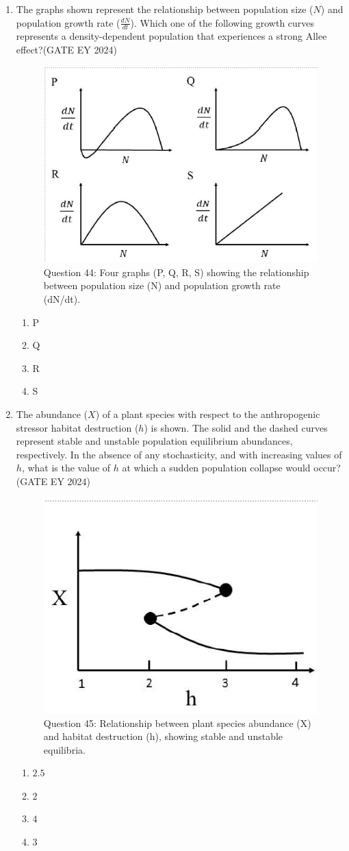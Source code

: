 \begin{enumerate}
\item The graphs shown represent the relationship between population size ($N$) and population growth rate ($\frac{dN}{dt}$). Which one of the following growth curves represents a density-dependent population that experiences a strong Allee effect?\hfill{(GATE EY 2024)}
\begin{figure}[!ht]
    \centering
    \includegraphics[width=0.3\columnwidth]{figs/Q-44.png}
    \caption{Question 44: Four graphs (P, Q, R, S) showing the relationship between population size (N) and population growth rate (dN/dt).}
    \label{Q.44}
\end{figure}
    \begin{multicols}{4}
    \begin{enumerate}
        \item P
        \item Q
        \item R
        \item S
    \end{enumerate}
    \end{multicols}

\item The abundance ($X$) of a plant species with respect to the anthropogenic stressor habitat destruction ($h$) is shown. The solid and the dashed curves represent stable and unstable population equilibrium abundances, respectively. In the absence of any stochasticity, and with increasing values of $h$, what is the value of $h$ at which a sudden population collapse would occur?\hfill{(GATE EY 2024)}
\begin{figure}[!ht]
    \centering
    \includegraphics[width=0.3\columnwidth]{figs/Q-45.png}
    \caption{Question 45: Relationship between plant species abundance (X) and habitat destruction (h), showing stable and unstable equilibria.}
    \label{Q.45}
\end{figure}
    \begin{multicols}{4}
    \begin{enumerate}
        \item $2.5$
        \item $2$
        \item $4$
        \item $3$
    \end{enumerate}
    \end{multicols}


\end{enumerate}
